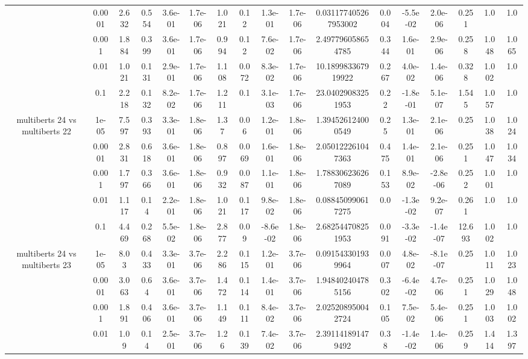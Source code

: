 \begin{tabular}{|c|c|c|c|c|c|c|c|c|c|c|c|c|c|c|c|c|}
 & 0.0001 & 2.632 & 0.554 & 3.6e-01 & 1.7e-06 & 1.021 & 0.12 & 1.3e-01 & 1.7e-06 & 0.031177405267953002 & 0.004 & -5.5e-02 & 2.0e-06 & 0.251 & 1.0 & 1.0 \\
 & 0.001 & 1.884 & 0.399 & 3.6e-01 & 1.7e-06 & 0.994 & 0.12 & 7.6e-02 & 1.7e-06 & 2.497796058654785 & 0.344 & 1.6e-01 & 2.9e-06 & 0.258 & 1.048 & 1.065 \\
 & 0.01 & 1.021 & 0.131 & 2.9e-01 & 1.7e-06 & 1.108 & 0.072 & 8.3e-02 & 1.7e-06 & 10.189983367919922 & 0.267 & 4.0e-02 & 1.4e-06 & 0.328 & 1.002 & 1.0 \\
 & 0.1 & 2.218 & 0.132 & 8.2e-02 & 1.7e-06 & 1.211 & 0.1 & 3.1e-03 & 1.7e-06 & 23.04029083251953 & 0.22 & -1.8e-01 & 5.1e-07 & 1.545 & 1.057 & 1.0 \\
\hline
\multirow{5}{*}{multiberts 24 vs multiberts 22} & 1e-05 & 7.597 & 0.393 & 3.3e-01 & 1.8e-06 & 1.37 & 0.06 & 1.2e-01 & 1.8e-06 & 1.394526124000549 & 0.25 & 1.3e-01 & 2.1e-06 & 0.25 & 1.038 & 1.024 \\
 & 0.0001 & 2.831 & 0.618 & 3.6e-01 & 1.8e-06 & 0.897 & 0.069 & 1.6e-01 & 1.8e-06 & 2.050122261047363 & 0.475 & 1.4e-01 & 2.1e-06 & 0.251 & 1.047 & 1.034 \\
 & 0.001 & 1.797 & 0.366 & 3.6e-01 & 1.8e-06 & 0.932 & 0.087 & 1.1e-01 & 1.8e-06 & 1.788306236267089 & 0.153 & 8.9e-02 & -2.8e-06 & 0.252 & 1.001 & 1.0 \\
 & 0.01 & 1.117 & 0.14 & 2.2e-01 & 1.8e-06 & 1.021 & 0.117 & 9.8e-02 & 1.8e-06 & 0.088450990617275 & 0.0 & -1.3e-02 & 9.2e-07 & 0.261 & 1.0 & 1.0 \\
 & 0.1 & 4.469 & 0.268 & 5.5e-02 & 1.8e-06 & 2.877 & 0.09 & -8.6e-02 & 1.8e-06 & 2.682544708251953 & 0.091 & -3.3e-02 & -1.4e-07 & 12.693 & 1.002 & 1.0 \\
\hline
\multirow{5}{*}{multiberts 24 vs multiberts 23} & 1e-05 & 8.03 & 0.433 & 3.3e-01 & 3.7e-06 & 2.286 & 0.115 & 1.2e-01 & 3.7e-06 & 0.091543301939964 & 0.007 & 4.8e-02 & -8.1e-07 & 0.25 & 1.011 & 1.023 \\
 & 0.0001 & 3.063 & 0.64 & 3.6e-01 & 3.7e-06 & 1.472 & 0.114 & 1.4e-01 & 3.7e-06 & 1.948402404785156 & 0.302 & -6.4e-02 & 4.7e-06 & 0.251 & 1.029 & 1.048 \\
 & 0.001 & 1.891 & 0.406 & 3.6e-01 & 3.7e-06 & 1.149 & 0.111 & 8.4e-02 & 3.7e-06 & 2.025208950042724 & 0.105 & 7.5e-02 & 5.4e-06 & 0.251 & 1.003 & 1.002 \\
 & 0.01 & 1.09 & 0.14 & 2.5e-01 & 3.7e-06 & 1.26 & 0.139 & 7.4e-02 & 3.7e-06 & 2.391141891479492 & 0.38 & -1.4e-02 & 1.4e-06 & 0.259 & 1.414 & 1.397 \\

\end{tabular}
